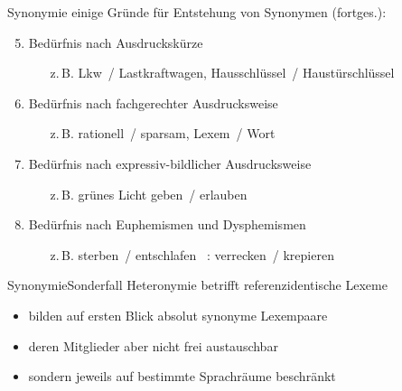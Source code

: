 \begin{frame}{Synonymie}
\onslide<+->
einige Gründe für Entstehung von Synonymen (fortges.):
\Halbzeile
\begin{enumerate}[<+->]\setcounter{enumi}{4}
	\item		Bedürfnis nach Ausdruckskürze
	\begin{itemize}
		\item[z.\,B.]	Lkw~/ Lastkraftwagen, Hausschlüssel~/ Haustürschlüssel
	\end{itemize}
        \Viertelzeile
	\item		Bedürfnis nach fachgerechter Ausdrucksweise
	\begin{itemize}
		\item[z.\,B.]	rationell~/ sparsam, Lexem~/ Wort
	\end{itemize}
        \Viertelzeile
	\item		Bedürfnis nach expressiv-bildlicher Ausdrucksweise
	\begin{itemize}
		\item[z.\,B.]	grünes Licht geben~/ erlauben
	\end{itemize}
        \Viertelzeile
	\item		Bedürfnis nach Euphemismen und Dysphemismen
	\begin{itemize}
		\item[z.\,B.]	sterben~/ entschlafen ~: verrecken~/ krepieren
	\end{itemize}
\end{enumerate}
\end{frame}

\begin{frame}{Synonymie}{Sonderfall Heteronymie}
\onslide<+->
betrifft referenzidentische Lexeme
\Halbzeile
\begin{itemize}[<+->]
	\item		bilden auf ersten Blick absolut synonyme Lexempaare
	\item		deren Mitglieder aber nicht frei austauschbar
	\item		sondern jeweils auf bestimmte Sprachräume beschränkt
\end{itemize}
\onslide<+->
\Zeile
\begin{exe}
	\ex\label{ex:synonymie-009}
    \begin{xlist}
		 \onslide<+->
		 \onslide<+->
	\end{xlist}
\end{exe}
\end{frame}

